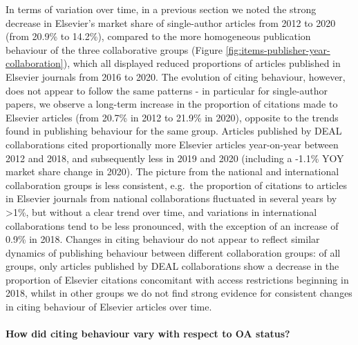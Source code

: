 \documentclass[
]{article}
\begin{document}
In terms of variation over time, in a previous section we noted the strong decrease in Elsevier's market share of single-author articles from 2012 to 2020 (from 20.9\% to 14.2\%), compared to the more homogeneous publication behaviour of the three collaborative groups (Figure \ref{fig:items-publisher-year-collaboration}), which all displayed reduced proportions of articles published in Elsevier journals from 2016 to 2020. The evolution of citing behaviour, however, does not appear to follow the same patterns - in particular for single-author papers, we observe a long-term increase in the proportion of citations made to Elsevier articles (from 20.7\% in 2012 to 21.9\% in 2020), opposite to the trends found in publishing behaviour for the same group. Articles published by DEAL collaborations cited proportionally more Elsevier articles year-on-year between 2012 and 2018, and subsequently less in 2019 and 2020 (including a -1.1\% YOY market share change in 2020). The picture from the national and international collaboration groups is less consistent, e.g.~the proportion of citations to articles in Elsevier journals from national collaborations fluctuated in several years by \textgreater1\%, but without a clear trend over time, and variations in international collaborations tend to be less pronounced, with the exception of an increase of 0.9\% in 2018. Changes in citing behaviour do not appear to reflect similar dynamics of publishing behaviour between different collaboration groups: of all groups, only articles published by DEAL collaborations show a decrease in the proportion of Elsevier citations concomitant with access restrictions beginning in 2018, whilst in other groups we do not find strong evidence for consistent changes in citing behaviour of Elsevier articles over time.

\hypertarget{how-did-citing-behaviour-vary-with-respect-to-oa-status}{%
\paragraph{How did citing behaviour vary with respect to OA status?}\label{how-did-citing-behaviour-vary-with-respect-to-oa-status}}
\end{document}
